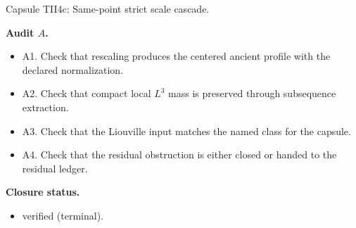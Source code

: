 \documentclass[11pt]{amsart}
\newcommand{\capsulefield}[1]{\par\smallskip\noindent\textbf{#1.}\ }
\begin{document}
\begin{proofcapsule}{Capsule TII4c: Same-point strict scale cascade.}
  \capsulefield{Audit \(A\)}
  \begin{itemize}[leftmargin=1.8em]
  \item A1. Check that rescaling produces the centered ancient profile with the declared normalization.
  \item A2. Check that compact local $L^3$ mass is preserved through subsequence extraction.
  \item A3. Check that the Liouville input matches the named class for the capsule.
  \item A4. Check that the residual obstruction is either closed or handed to the residual ledger.
  \end{itemize}
  \capsulefield{Closure status}
  \begin{itemize}[leftmargin=1.8em]
  \item verified (terminal).
  \end{itemize}
\end{proofcapsule}
\end{document}
